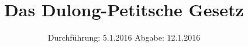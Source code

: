 

\subject{V201}
\title{Das Dulong-Petitsche Gesetz}
\date{
  Durchführung: 5.1.2016
  \hspace{3em}
  Abgabe: 12.1.2016
}



\maketitle
\thispagestyle{empty}
\tableofcontents
\newpage








\printbibliography


